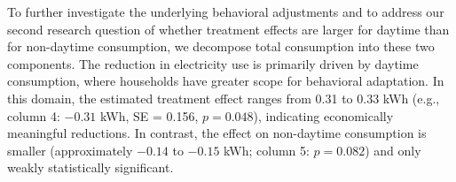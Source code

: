 To further investigate the underlying behavioral adjustments and to address our second research question of whether treatment effects are larger for daytime than for non-daytime consumption, we decompose total consumption into these two components. The reduction in electricity use is primarily driven by daytime consumption, where households have greater scope for behavioral adaptation. In this domain, the estimated treatment effect ranges from 0.31 to 0.33 kWh (e.g., column 4: $-0.31$ kWh, SE = 0.156, $p = 0.048$), indicating economically meaningful reductions. In contrast, the effect on non-daytime consumption is smaller (approximately $-0.14$ to $-0.15$ kWh; column 5: $p = 0.082$) and only weakly statistically significant.



\begin{table}[H]
\centering
\caption{Effect of App Access on Electricity Consumption}
\label{table:main_results}
\begin{threeparttable}


\end{threeparttable}
\end{table}
